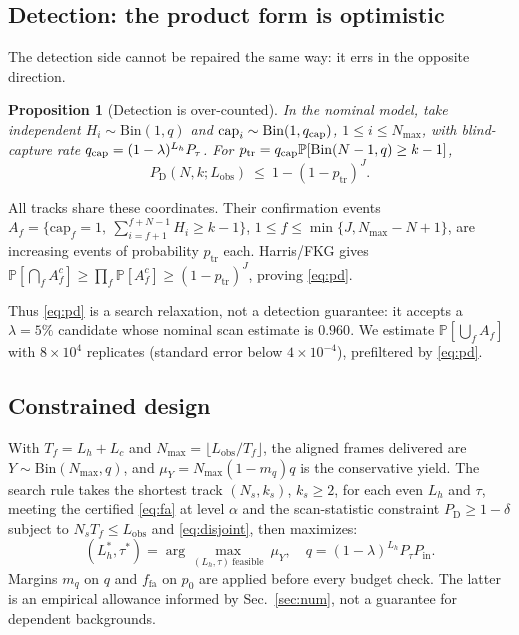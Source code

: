 \documentclass[journal]{IEEEtran}
\newcommand{\Tf}{T_f}
\newcommand{\Lobs}{L_{\mathrm{obs}}}
\newcommand{\Ns}{N_s}
\newcommand{\ks}{k_s}
\newcommand{\Nmax}{N_{\max}}
\newcommand{\muY}{\mu_Y}
\newcommand{\Lh}{L_h}
\newcommand{\Prob}{\mathbb{P}}
\newcommand{\Bin}{\mathrm{Bin}}
\newtheorem{proposition}{Proposition}
\begin{document}
\subsection{Detection: the product form is optimistic}
The detection side cannot be repaired the same way: it errs in the opposite direction.

\begin{proposition}[Detection is over-counted]
\label{thm:fkg}
In the nominal model, take independent $H_i\sim\Bin(1,q)$ and $\mathrm{cap}_i\sim\Bin(1,q_{\rm cap})$, $1\le i\le\Nmax$, with blind-capture rate $q_{\rm cap}=(1-\lambda)^{\Lh}P_\tau$. For $p_{\mathrm{tr}}=q_{\rm cap}\Prob[\Bin(N-1,q)\ge k-1]$,
\begin{equation}
P_{\mathrm{D}}(N,k;\Lobs)\ \le\ 1-(1-p_{\mathrm{tr}})^{J}.
\label{eq:pd}
\end{equation}
\end{proposition}
\begin{IEEEproof}
All tracks share these coordinates. Their confirmation events $A_f=\{\mathrm{cap}_f=1,\ \sum_{i=f+1}^{f+N-1}H_i\ge k-1\}$, $1\le f\le\min\{J,\Nmax-N+1\}$, are increasing events of probability $p_{\mathrm{tr}}$ each. Harris/FKG gives $\Prob[\bigcap_f A_f^c]\ge\prod_f\Prob[A_f^c]\ge(1-p_{\mathrm{tr}})^J$, proving \eqref{eq:pd}.
\end{IEEEproof}

Thus \eqref{eq:pd} is a search relaxation, not a detection guarantee: it accepts a $\lambda=5\%$ candidate whose nominal scan estimate is $0.960$. We estimate $\Prob[\bigcup_f A_f]$ with $8\times10^4$ replicates (standard error below $4\times10^{-4}$), prefiltered by \eqref{eq:pd}.

\subsection{Constrained design}
With $\Tf=\Lh+L_c$ and $\Nmax=\lfloor \Lobs/\Tf\rfloor$, the aligned frames delivered are $Y\sim\Bin(\Nmax,q)$, and $\muY=\Nmax(1-m_q)q$ is the conservative yield. The search rule takes the shortest track $(\Ns,\ks)$, $\ks\ge2$, for each even $\Lh$ and $\tau$, meeting the certified \eqref{eq:fa} at level $\alpha$ and the scan-statistic constraint $P_{\mathrm D}\ge1-\delta$ subject to $\Ns\Tf\le\Lobs$ and \eqref{eq:disjoint}, then maximizes:
\begin{equation}
(\Lh^\ast,\tau^\ast)=\arg\!\max_{(\Lh,\tau)\ \text{feasible}}\ \muY,\quad q=(1-\lambda)^{\Lh}P_\tau P_{\mathrm{in}}.
\label{eq:design}
\end{equation}
Margins $m_q$ on $q$ and $f_{\mathrm{fa}}$ on $p_0$ are applied before every budget check. The latter is an empirical allowance informed by Sec.~\ref{sec:num}, not a guarantee for dependent backgrounds.
\end{document}

